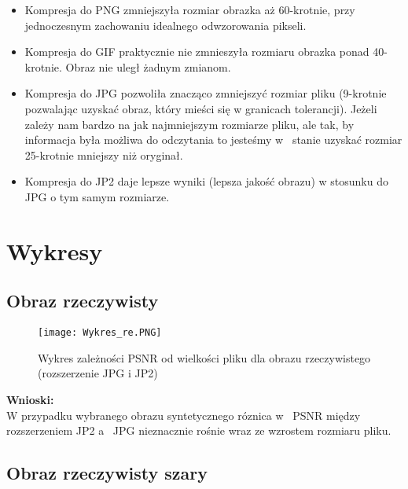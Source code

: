 \documentclass[a4paper, 12pt]{article}
\begin{document}
\begin{itemize}
  \setlength\itemsep{-0.2cm}
    \item Kompresja do PNG zmniejszyła rozmiar obrazka aż 60-krotnie, przy jednoczesnym 
    zachowaniu idealnego odwzorowania pikseli. 
    \item Kompresja do GIF praktycznie nie zmnieszyła rozmiaru obrazka ponad 40-krotnie.
    Obraz nie uległ żadnym zmianom.
     \item Kompresja do JPG pozwoliła znacząco zmniejszyć rozmiar pliku (9-krotnie
     pozwalając uzyskać obraz, który mieści się w granicach tolerancji). Jeżeli zależy nam bardzo
     na jak najmniejszym rozmiarze pliku, ale tak, by informacja była możliwa do odczytania to jesteśmy 
     w~ stanie uzyskać rozmiar 25-krotnie mniejszy niż oryginał.
     \item Kompresja do JP2 daje lepsze wyniki (lepsza jakość obrazu) w stosunku do JPG o tym samym rozmiarze.
  \end{itemize}

\section{Wykresy}

\subsection{Obraz rzeczywisty}

\begin{figure}[H]

\centering

{\texttt{[image: Wykres\_re.PNG]}}

\captionsetup{justification=centering}

\caption{Wykres zależności PSNR od wielkości pliku dla obrazu rzeczywistego \\ (rozszerzenie JPG i JP2)}

\label{fig:fig5}
\end{figure}

\textbf{Wnioski:} \\
W przypadku wybranego obrazu syntetycznego róznica w~ PSNR między rozszerzeniem JP2 a~ JPG nieznacznie rośnie wraz ze wzrostem 
rozmiaru pliku. 

\subsection{Obraz rzeczywisty szary}
\end{document}
